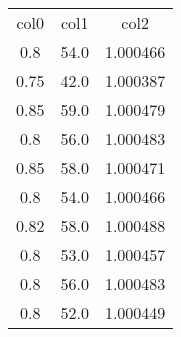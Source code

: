 \begin{table}
\begin{tabular}{ccc}
col0 & col1 & col2 \\
0.8 & 54.0 & 1.000466 \\
0.75 & 42.0 & 1.000387 \\
0.85 & 59.0 & 1.000479 \\
0.8 & 56.0 & 1.000483 \\
0.85 & 58.0 & 1.000471 \\
0.8 & 54.0 & 1.000466 \\
0.82 & 58.0 & 1.000488 \\
0.8 & 53.0 & 1.000457 \\
0.8 & 56.0 & 1.000483 \\
0.8 & 52.0 & 1.000449 \\
\end{tabular}
\end{table}
